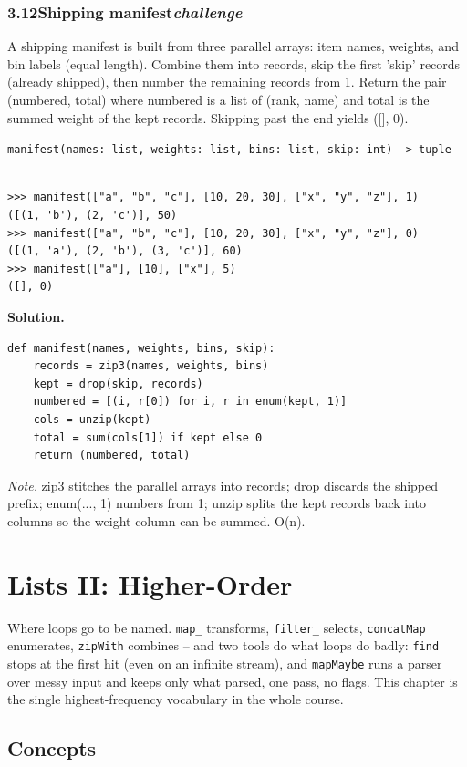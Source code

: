 \documentclass[10pt,letterpaper]{book}
\begin{document}
\subsection*{3.12\quad Shipping manifest\hfill\textnormal{\textit{challenge}}}
A shipping manifest is built from three parallel arrays: item names, weights, and bin labels (equal length). Combine them into records, skip the first 'skip' records (already shipped), then number the remaining records from 1. Return the pair (numbered, total) where numbered is a list of (rank, name) and total is the summed weight of the kept records. Skipping past the end yields ([], 0).

\noindent\texttt{manifest(names: list, weights: list, bins: list, skip: int) -> tuple}
\begin{lstlisting}[style=ex]

>>> manifest(["a", "b", "c"], [10, 20, 30], ["x", "y", "z"], 1)
([(1, 'b'), (2, 'c')], 50)
>>> manifest(["a", "b", "c"], [10, 20, 30], ["x", "y", "z"], 0)
([(1, 'a'), (2, 'b'), (3, 'c')], 60)
>>> manifest(["a"], [10], ["x"], 5)
([], 0)

\end{lstlisting}
\noindent\textbf{Solution.}
\begin{lstlisting}[style=code]
def manifest(names, weights, bins, skip):
    records = zip3(names, weights, bins)
    kept = drop(skip, records)
    numbered = [(i, r[0]) for i, r in enum(kept, 1)]
    cols = unzip(kept)
    total = sum(cols[1]) if kept else 0
    return (numbered, total)
\end{lstlisting}
\noindent\textit{Note.} zip3 stitches the parallel arrays into records; drop discards the shipped prefix; enum(..., 1) numbers from 1; unzip splits the kept records back into columns so the weight column can be summed. O(n).

\clearpage
\chapter{Lists II: Higher-Order}

Where loops go to be named. \texttt{map\_} transforms, \texttt{filter\_}
selects, \texttt{concatMap} enumerates, \texttt{zipWith} combines --
and two tools do what loops do badly: \texttt{find} stops at the first hit
(even on an infinite stream), and \texttt{mapMaybe} runs a parser over messy
input and keeps only what parsed, one pass, no flags. This chapter is the
single highest-frequency vocabulary in the whole course.
\section{Concepts}
\end{document}
